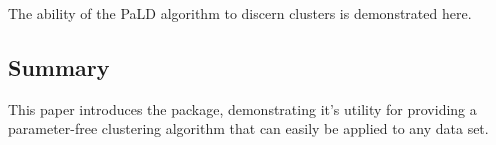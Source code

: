 The ability of the PaLD algorithm to discern clusters is demonstrated
here.

\hypertarget{summary}{%
\subsection{Summary}\label{summary}}

This paper introduces the  package, demonstrating it's
utility for providing a parameter-free clustering algorithm that can
easily be applied to any data set.




\address{%
Lucy D'Agostino McGowan\\
Wake Forest University\\%
Winston-Salem, NC\\ 27106\\
%
%
%
\href{mailto:mcgowald@wfu.edu}{\nolinkurl{mcgowald@wfu.edu}}%
}

\address{%
Katherine Moore\\
Wake Forest Unversity\\%
Winston-Salem, NC\\ 27106\\
%
%
%
\href{mailto:mooreke@wfu.edu}{\nolinkurl{mooreke@wfu.edu}}%
}

\address{%
Kenneth Berenhaut\\
Wake Forest University\\%
Winston-Salem, NC\\ 27106\\
%
%
%
\href{mailto:berenhks@wfu.edu}{\nolinkurl{berenhks@wfu.edu}}%
}
